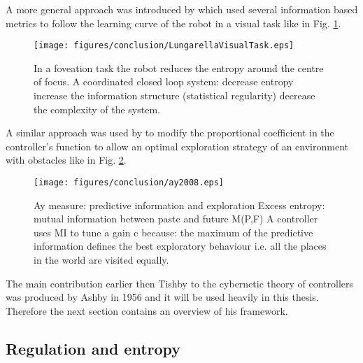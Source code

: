 A more general approach was introduced by \citet{LungarellaInformation} which
used several information based metrics to follow the learning curve of the robot
in a visual task like in Fig. \ref{fig:conclusion:lungarella}.

\begin{figure}[htbp]
\begin{center}
\texttt{[image: figures/conclusion/LungarellaVisualTask.eps]}
\end{center}
\vspace*{4pt}
\caption[Foveation task]{
In a foveation task the robot reduces the entropy
around the centre of focus.
A coordinated closed loop system:
decrease entropy
increase the information structure (statistical regularity)
decrease the complexity of the system.
\label{fig:conclusion:lungarella}}
\end{figure}

A similar approach was used by \citet{AyClosedLoop} to modify the proportional
coefficient in the controller's function to allow an optimal exploration strategy
of an environment with obstacles like in Fig. \ref{fig:conclusion:ay}.

\begin{figure}[htbp]
\begin{center}
\texttt{[image: figures/conclusion/ay2008.eps]}
\end{center}
\vspace*{4pt}
\caption[Ay information measure]
{Ay measure: predictive information and exploration
Excess entropy: mutual information between paste and future M(P,F)
A controller uses MI to tune a gain c because:
the maximum of the predictive information defines the best exploratory
behaviour i.e. all the places in the world are visited equally.
\label{fig:conclusion:ay}}
\end{figure}

The main contribution earlier then Tishby to the cybernetic theory of controllers
was produced by Ashby in 1956 and it will be used heavily in this thesis.
Therefore the next section contains an overview of his framework.

\subsection{Regulation and entropy \label{Appendix:Ashby}}

